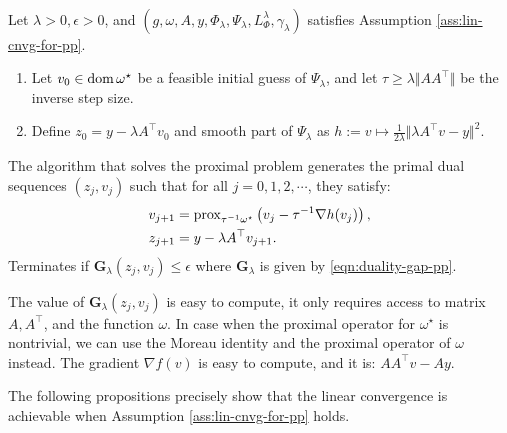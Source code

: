 \documentclass[12pt]{article}
\begin{document}
        \begin{definition}\;\label{def:ista-inner-lp}\\
            Let $\lambda > 0, \epsilon > 0$, and $(g, \omega, A, y, \Phi_\lambda, \Psi_\lambda, L^\lambda_{\Phi} ,\gamma_\lambda)$ satisfies Assumption \ref{ass:lin-cnvg-for-pp}. 
            \begin{enumerate}[nosep]
                \item Let $v_0\in\operatorname{dom} \omega^\star$ be a feasible initial guess of $\Psi_{\lambda}$, and let $\tau \ge \lambda\Vert AA^\top\Vert$ be the inverse step size. 
                \item Define $z_0 = y - \lambda A^\top v_0$ and smooth part of $\Psi_\lambda$ as $h := v \mapsto \frac{1}{2\lambda}\Vert \lambda A^\top v - y\Vert^2$. 
            \end{enumerate}
            The algorithm that solves the proximal problem generates the primal dual sequences $(z_j, v_j)$ such that for all $j = 0, 1, 2, \cdots$, they satisfy: 
            \begin{align*}
                v_{j + 1} &= \operatorname{prox}_{\tau^{-1} \omega^\star}\left(
                    v_{j} - \tau^{-1}\nabla h(v_j)
                \right), 
                \\
                z_{j + 1} &= y - \lambda A^\top v_{j + 1}. 
            \end{align*}
            Terminates if $\mathbf G_\lambda(z_j, v_j) \le \epsilon$ where $\mathbf G_\lambda$ is given by \eqref{eqn:duality-gap-pp}. 
        \end{definition}
        \begin{remark}
            The value of $\mathbf G_\lambda(z_j, v_j)$ is easy to compute, it only requires access to matrix $A, A^\top$, and the function $\omega$. 
            In case when the proximal operator for $\omega^\star$ is nontrivial, we can use the Moreau identity and the proximal operator of $\omega$ instead. 
            The gradient $\nabla f(v)$ is easy to compute, and it is: $AA^\top v - Ay$.
        \end{remark}
        \par
        The following propositions precisely show that the linear convergence is achievable when Assumption \ref{ass:lin-cnvg-for-pp} holds. 
\end{document}
